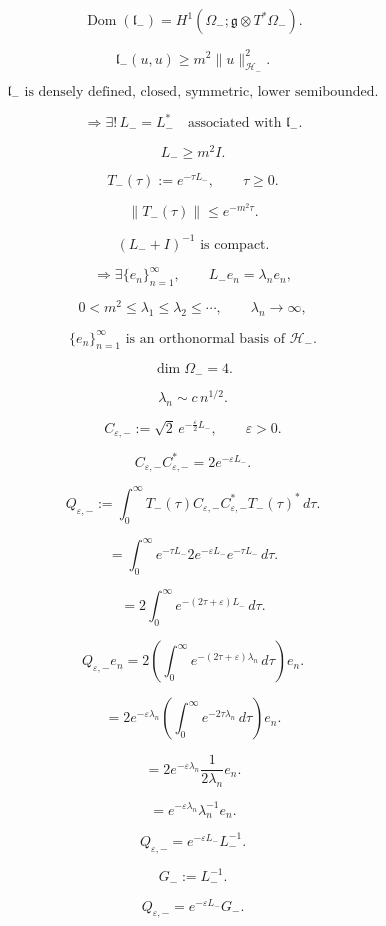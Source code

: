 \documentclass[11pt]{article}
\begin{document}
\[
\operatorname{Dom}(\mathfrak l_-)
=
H^1(\Omega_-;\mathfrak g\otimes T^\ast\Omega_-).
\]

\[
\mathfrak l_-(u,u)\ge m^2\|u\|_{\mathcal H_-}^2.
\]

\[
\mathfrak l_-
\text{ is densely defined, closed, symmetric, lower semibounded}.
\]

\[
\Longrightarrow
\exists!\,L_-=L_-^\ast
\quad
\text{associated with }\mathfrak l_-.
\]

\[
L_-\ge m^2I.
\]

\[
T_-(\tau):=e^{-\tau L_-},
\qquad
\tau\ge0.
\]

\[
\|T_-(\tau)\|\le e^{-m^2\tau}.
\]

\[
(L_-+I)^{-1}
\text{ is compact}.
\]

\[
\Longrightarrow
\exists\{e_n\}_{n=1}^{\infty},
\qquad
L_-e_n=\lambda_ne_n,
\]

\[
0<m^2\le\lambda_1\le\lambda_2\le\cdots,
\qquad
\lambda_n\to\infty,
\]

\[
\{e_n\}_{n=1}^{\infty}
\text{ is an orthonormal basis of }\mathcal H_-.
\]

\[
\dim\Omega_-=4.
\]

\[
\lambda_n\sim c\,n^{1/2}.
\]

\[
C_{\varepsilon,-}:=\sqrt{2}\,e^{-\frac{\varepsilon}{2}L_-},
\qquad
\varepsilon>0.
\]

\[
C_{\varepsilon,-}C_{\varepsilon,-}^\ast
=
2e^{-\varepsilon L_-}.
\]

\[
Q_{\varepsilon,-}
:=
\int_0^\infty
T_-(\tau)
C_{\varepsilon,-}C_{\varepsilon,-}^\ast
T_-(\tau)^\ast\,d\tau.
\]

\[
=
\int_0^\infty
e^{-\tau L_-}
2e^{-\varepsilon L_-}
e^{-\tau L_-}
\,d\tau.
\]

\[
=
2\int_0^\infty
e^{-(2\tau+\varepsilon)L_-}\,d\tau.
\]

\[
Q_{\varepsilon,-}e_n
=
2
\left(
\int_0^\infty
e^{-(2\tau+\varepsilon)\lambda_n}\,d\tau
\right)e_n.
\]

\[
=
2e^{-\varepsilon\lambda_n}
\left(
\int_0^\infty e^{-2\tau\lambda_n}\,d\tau
\right)e_n.
\]

\[
=
2e^{-\varepsilon\lambda_n}
\frac{1}{2\lambda_n}e_n.
\]

\[
=
e^{-\varepsilon\lambda_n}\lambda_n^{-1}e_n.
\]

\[
\boxed{
Q_{\varepsilon,-}
=
e^{-\varepsilon L_-}L_-^{-1}.
}
\]

\[
G_-:=L_-^{-1}.
\]

\[
\boxed{
Q_{\varepsilon,-}
=
e^{-\varepsilon L_-}G_-.
}
\]
\end{document}
